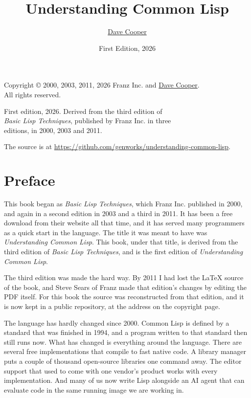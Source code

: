 \documentclass[11pt]{book}
\title{Understanding Common Lisp}
\author{\href{https://davecooper.name}{Dave Cooper}}
\date{First Edition, 2026}
\begin{document}
\frontmatter

\maketitle

\clearpage
\thispagestyle{empty}
\vspace*{\fill}
\begin{center}
Copyright \copyright{} 2000, 2003, 2011, 2026 Franz Inc. and
\href{https://davecooper.name}{Dave Cooper}.\\
All rights reserved.

\medskip
First edition, 2026. Derived from the third edition of\\
\emph{Basic Lisp Techniques}, published by Franz Inc. in three\\
editions, in 2000, 2003 and 2011.

\medskip
The source is at
\url{https://github.com/genworks/understanding-common-lisp}.
\end{center}
\vspace*{\fill}
\clearpage

\chapter*{Preface}

This book began as \emph{Basic Lisp Techniques}, which Franz Inc.
published in 2000, and again in a second edition in 2003 and a third
in 2011. It has been a free download from their website all that time,
and it has served many programmers as a quick start in the language.
The title it was meant to have was \emph{Understanding Common Lisp}.
This book, under that title, is derived from the third edition of
\emph{Basic Lisp Techniques}, and is the first edition of
\emph{Understanding Common Lisp}.

The third edition was made the hard way. By 2011 I had lost the LaTeX
source of the book, and Steve Sears of Franz made that edition's
changes by editing the PDF itself. For this book the source was
reconstructed from that edition, and it is now kept in a public
repository, at the address on the copyright page.

The language has hardly changed since 2000. Common Lisp is defined by
a standard that was finished in 1994, and a program written to that
standard then still runs now. What has changed is everything around
the language. There are several free implementations that compile to
fast native code. A library manager puts a couple of thousand
open-source libraries one command away. The editor support that used
to come with one vendor's product works with every implementation.
And many of us now write Lisp alongside an AI agent that can evaluate
code in the same running image we are working in.
\end{document}
